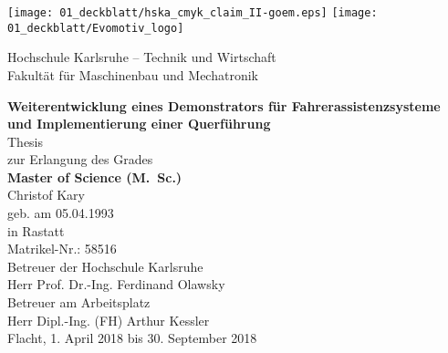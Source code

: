 \renewcommand{\maketitle}{%

\begin{titlepage}
	\thispagestyle{empty}
	\oddsidemargin14mm
	\evensidemargin4mm
	\centering
	\begin{center}
		

		\texttt{[image: 01\_deckblatt/hska\_cmyk\_claim\_II-goem.eps]} \hfill
		\texttt{[image: 01\_deckblatt/Evomotiv\_logo]}\\ 
		
		\vspace{2em}
		
		\large{Hochschule Karlsruhe -- Technik und Wirtschaft \\ Fakultät für Maschinenbau und Mechatronik}\\
		
		\vspace{10mm}
	
		\textsf{
		{\huge  \bfseries Weiterentwicklung eines Demonstrators für Fahrerassistenzsysteme und Implementierung einer Querführung\\}}
		\vspace{15mm}
		\large{Thesis \\zur Erlangung des Grades \\ \vspace{1ex}
		\bfseries Master of Science (M.~Sc.)}
		\vspace{15mm}\\
		Christof Kary\\
		geb. am 05.04.1993\\
		in Rastatt\\
		Matrikel-Nr.: 58516\\
		
		\vspace{15mm}
		Betreuer der Hochschule Karlsruhe\\
		Herr Prof. Dr.-Ing. Ferdinand Olawsky\\
		\vspace{1em}
		Betreuer am Arbeitsplatz\\
		Herr Dipl.-Ing. (FH) Arthur Kessler\\
		
		\vspace{10mm}
		Flacht, 1. April 2018 bis 30. September 2018\\

	\end{center}

\end{titlepage}
}


\maketitle
